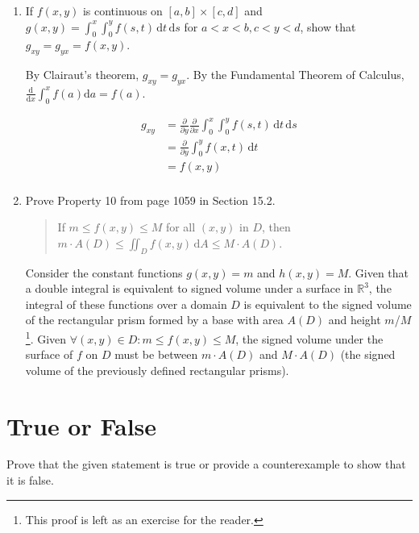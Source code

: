\documentclass[11pt]{article}
\begin{document}
\begin{enumerate}
\item If \(f(x,y)\) is continuous on \([a,b] \times [c,d]\) and
  \(g(x,y) = \int_0^x \int_0^y f(s,t) \, \mathrm{d}t \, \mathrm{d}s\) for
  \(a < x < b, c < y < d\), show that \(g_{xy} = g_{yx} = f(x,y)\).

  By Clairaut's theorem, \(g_{xy} = g_{yx}\). By the Fundamental Theorem of
  Calculus, \(\frac{\mathrm{d}}{\mathrm{d}x} \int_0^x f(a) \mathrm{d}a = f(a)\).

  \begin{align*}
    g_{xy} &= \frac{\partial}{\partial y} \frac{\partial}{\partial x} \int_0^x \int_0^y f(s,t) \, \mathrm{d}t \, \mathrm{d}s \\
           &= \frac{\partial}{\partial y} \int_0^y f(x, t) \, \mathrm{d}t \\
           &= f(x, y) \\
  \end{align*}

\item Prove Property 10 from page 1059 in Section 15.2.
  \begin{quote}
    If \(m \leq f(x,y) \leq M\) for all \((x,y)\) in \(D\), then
    \(m \cdot A(D) \leq \iint_D f(x,y) \, \mathrm{d}A \leq M \cdot A(D)\).
  \end{quote}

  Consider the constant functions \(g(x, y) = m\) and \(h(x, y) = M\). Given
  that a double integral is equivalent to signed volume under a surface in
  \(\mathbb{R}^3\), the integral of these functions over a domain \(D\) is
  equivalent to the signed volume of the rectangular prism formed by a base with
  area \(A(D)\) and height \(m\)/\(M\)\footnote{This proof is left as an
    exercise for the reader.}. Given
  \(\forall (x, y) \in D : m \leq f(x, y) \leq M\), the signed volume under the
  surface of \(f\) on \(D\) must be between \(m \cdot A(D)\) and
  \(M \cdot A(D)\) (the signed volume of the previously defined rectangular
  prisms).
\end{enumerate}

\section*{True or False}
Prove that the given statement is true or provide a counterexample to show that it is false.
\end{document}
